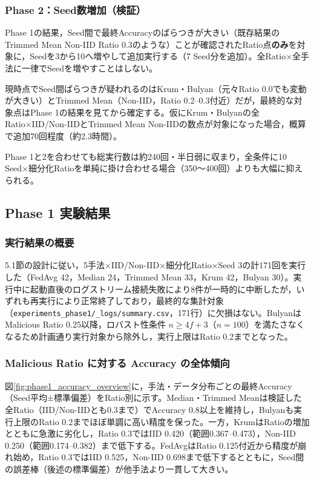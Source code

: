 \documentclass[a4j, twocolumn, dvipdfmx]{jsarticle}  %
\begin{document}
\subsubsection{Phase 2：Seed数増加（検証）}

Phase 1の結果，Seed間で最終Accuracyのばらつきが大きい（既存結果のTrimmed Mean Non-IID Ratio 0.3のような）ことが確認されたRatio点\textbf{のみ}を対象に，Seedを3から10へ増やして追加実行する（7 Seed分を追加）。全Ratio×全手法に一律でSeedを増やすことはしない。

現時点でSeed間ばらつきが疑われるのはKrum・Bulyan（元々Ratio 0.0でも変動が大きい）とTrimmed Mean（Non-IID，Ratio 0.2--0.3付近）だが，最終的な対象点はPhase 1の結果を見てから確定する。仮にKrum・Bulyanの全Ratio×IID/Non-IIDとTrimmed Mean Non-IIDの数点が対象になった場合，概算で追加70回程度（約2.3時間）。

Phase 1と2を合わせても総実行数は約240回・半日弱に収まり，全条件に10 Seed×細分化Ratioを単純に掛け合わせる場合（350〜400回）よりも大幅に抑えられる。

\subsection{Phase 1 実験結果}
\label{sec:phase1_results}

\subsubsection{実行結果の概要}

5.1節の設計に従い，5手法×IID/Non-IID×細分化Ratio×Seed 3の計171回を実行した（FedAvg 42，Median 24，Trimmed Mean 33，Krum 42，Bulyan 30）。実行中に起動直後のログストリーム接続失敗により8件が一時的に中断したが，いずれも再実行により正常終了しており，最終的な集計対象（\texttt{experiments\_phase1/\_logs/summary.csv}，171行）に欠損はない。BulyanはMalicious Ratio 0.25以降，ロバスト性条件 $n \geq 4f+3$（$n=100$）を満たさなくなるため計画通り実行対象から除外し，実行上限はRatio 0.2までとなった。

\subsubsection{Malicious Ratio に対する Accuracy の全体傾向}

図\ref{fig:phase1_accuracy_overview}に，手法・データ分布ごとの最終Accuracy（Seed平均±標準偏差）をRatio別に示す。Median・Trimmed Meanは検証した全Ratio（IID/Non-IIDとも0.3まで）でAccuracy 0.8以上を維持し，Bulyanも実行上限のRatio 0.2までほぼ単調に高い精度を保った。一方，KrumはRatioの増加とともに急激に劣化し，Ratio 0.3ではIID 0.420（範囲0.367--0.473），Non-IID 0.250（範囲0.174--0.382）まで低下する。FedAvgはRatio 0.125付近から精度が崩れ始め，Ratio 0.3ではIID 0.525，Non-IID 0.698まで低下するとともに，Seed間の誤差棒（後述の標準偏差）が他手法より一貫して大きい。
\end{document}
